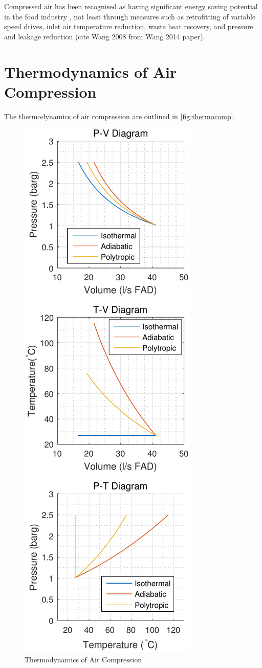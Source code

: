 Compressed air has been recognised as having significant energy saving potential in the food industry \cite{Wang2014}, not least through measures such as retrofitting of variable speed drives, inlet air temperature reduction, waste heat recovery, and pressure and leakage reduction (cite Wang 2008 from Wang 2014 paper).

\section{Thermodynamics of Air Compression}
The thermodynamics of air compression are outlined in \autoref{fig:thermocomp}.

\begin{figure}
\includegraphics[height = \textheight]{./Images/Compression_ThermoDiagrams.pdf}
\caption{Thermodynamics of Air Compression}
\label{fig:thermocomp}
\end{figure}
